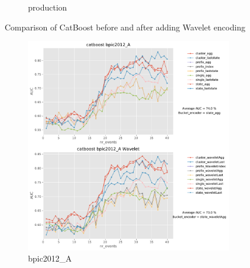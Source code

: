 \documentclass[twoside,11pt]{Latex/Classes/PhDthesisPSnPDF}
\begin{document}
\begin{figure}[!htbp]
\begin{subfigure}{0.48\textwidth}
		\caption{production}
	\end{subfigure}
		\caption{Comparison of CatBoost before and after adding Wavelet encoding}
	\label{fig:wc1}
\end{figure}

\begin{figure}[!htbp] %

	\begin{subfigure}{0.48\textwidth}
		\includegraphics[width=\linewidth]{images/wavelet/graphs2cat/bpic2012_A.pdf}
		\caption{bpic2012\_A} 
	\end{subfigure}\hspace*{\fill}
	\begin{subfigure}{0.48\textwidth}

\end{subfigure}
\end{figure}
\end{document}
